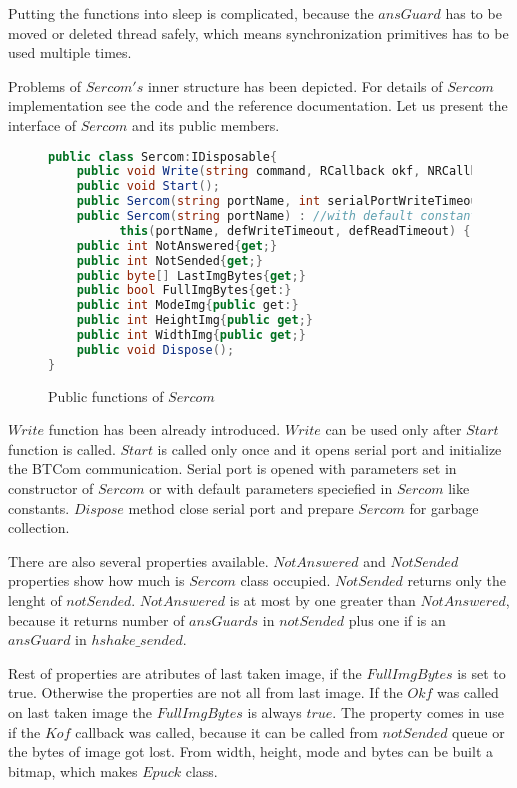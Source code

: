	Putting the functions into sleep is complicated, because the $ansGuard$ has to be moved or deleted thread safely,
	which means synchronization primitives has to be used multiple times.
	
	
	Problems of $Sercom's$ inner structure has been depicted. For details of 
	$Sercom$ implementation see the code and the reference documentation.
	Let  us present the interface of $Sercom$ and its public members.
	

\begin{figure}[!hbp]
\begin{lstlisting}[language=cs]
public class Sercom:IDisposable{
	public void Write(string command, RCallback okf, NRCallback kof,object state, double timeout);
	public void Start();
	public Sercom(string portName, int serialPortWriteTimeout, int serialPortReadTimeout);
	public Sercom(string portName) : //with default constants
	      this(portName, defWriteTimeout, defReadTimeout) { }
	public int NotAnswered{get;}
	public int NotSended{get;}
	public byte[] LastImgBytes{get;}
	public bool FullImgBytes{get:}
	public int ModeImg{public get:}
	public int HeightImg{public get;}
	public int WidthImg{public get;}
	public void Dispose();
}
\end{lstlisting}
\caption{Public functions of $Sercom$} \label{publicser}	
\end{figure}

	$Write$ function has been already introduced. $Write$ can be used only
	after $Start$ function is called. $Start$ is called only once and it opens serial port and initialize
	the BTCom communication. Serial port is opened with parameters set in constructor of $Sercom$ or with
	default parameters speciefied in $Sercom$ like constants. $Dispose$ method close serial port
	and prepare $Sercom$ for garbage collection.

	There are also several properties available. $NotAnswered$ and $NotSended$ properties
	show how much is $Sercom$ class occupied. $NotSended$ returns only the lenght of $notSended$. $NotAnswered$ is at most by one greater than $NotAnswered$,
	because it returns number of $ansGuards$ in $notSended$ plus one if is an $ansGuard$ in $hshake\_sended$.
	

	Rest of properties are atributes of last taken image, if the $FullImgBytes$ is set to true.
	Otherwise the properties are not all from last image.
	If the $Okf$ was called on last taken image the $FullImgBytes$ is always $true$. The property
	comes in use if the $Kof$ callback was called, because it can be called from $notSended$ queue 
	or the bytes of image got lost. From width, height, mode and bytes can be built a bitmap, which
	makes $Epuck$ class.
